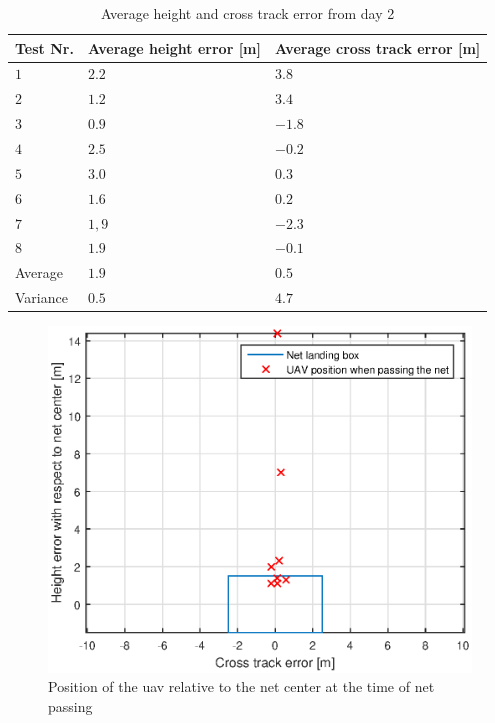 \begin{table}[H]
\centering
\begin{tabular}{| l | l | l |}
\hline
\textbf{Test Nr.} 	& \textbf{Average height error [m]} 	& \textbf{Average cross track error [m]}  \\ \hline
$1$				& $2.2$							& $3.8$										\\ \hline
$2$				& $1.2$							& $3.4$										\\ \hline
$3$				& $0.9$							& $-1.8$									\\ \hline
$4$				& $2.5$							& $-0.2$									\\ \hline
$5$				& $3.0$							& $0.3$										\\ \hline
$6$				& $1.6$							& $0.2$										\\ \hline
$7$				& $1,9$							& $-2.3$									\\ \hline
$8$				& $1.9$							& $-0.1$									\\ \hline
Average			& $1.9$							& $0.5$										\\ \hline
Variance		& $0.5$							& $4.7$										\\ \hline
\end{tabular}
\caption{Average height and cross track error from day 2}
\label{Tb:AverageCrossHeightDay2}
\end{table}
\begin{figure}[H]
\centering
\includegraphics[scale=0.7]{figs/Experiment/day2NetHit.eps}
\caption{Position of the \gls{uav} relative to the net center at the time of net passing}
\label{Fig:Day2NetPass}
\end{figure}
